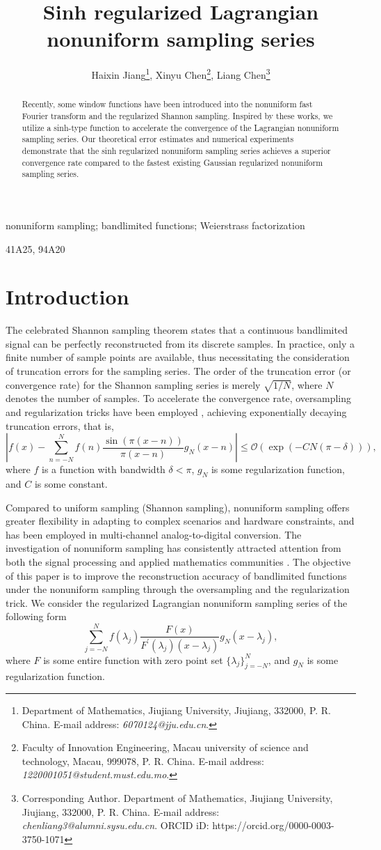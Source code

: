 \documentclass[a4paper]{article}
\title{Sinh regularized Lagrangian nonuniform sampling series}
\author{Haixin Jiang\thanks{Department of Mathematics, Jiujiang University, Jiujiang, 332000, P. R. China. E-mail address: {\it 6070124@jju.edu.cn}.}, \quad Xinyu Chen\thanks{Faculty of Innovation Engineering, Macau university of science and technology, Macau, 999078, P. R. China. E-mail address: {\it 1220001051@student.must.edu.mo}.}, \quad Liang Chen\thanks{ Corresponding Author.   Department of Mathematics, Jiujiang University, Jiujiang, 332000, P. R. China. E-mail address: {\it chenliang3@alumni.sysu.edu.cn}.   ORCID iD: https://orcid.org/0000-0003-3750-1071}}
\date{}
\numberwithin{equation}{section}
\begin{document}
\maketitle

\begin{abstract}
Recently, some window functions have been introduced into the nonuniform fast Fourier transform and the regularized Shannon sampling. Inspired by these works, we utilize a sinh-type function to accelerate the convergence of the Lagrangian nonuniform sampling series. Our theoretical error estimates and numerical experiments demonstrate that the sinh regularized nonuniform sampling series achieves a superior convergence rate compared to the fastest existing Gaussian regularized nonuniform sampling series.
\end{abstract}

 nonuniform sampling; bandlimited functions; Weierstrass factorization

 41A25, 94A20
\section{Introduction}


The celebrated Shannon sampling theorem states that a continuous bandlimited signal can be perfectly reconstructed from its discrete samples. In practice, only a finite number of sample points are available, thus necessitating the consideration of truncation errors for the sampling series. The order of the truncation error (or convergence rate) for the Shannon sampling series is merely $\sqrt{1/N}$, where $N$ denotes the number of samples. To accelerate the convergence rate, oversampling and regularization tricks have been employed \cite{jagerman1966bounds,Wei1997}, achieving exponentially decaying truncation errors, that is,
$$\left|f(x)-\sum_{n=-N}^{N}f(n)\frac{\sin(\pi(x-n))}{\pi(x-n)}g_{N}(x-n)\right|\le \mathcal{O}(\exp(-CN(\pi-\delta))), $$
where $f$ is a function with bandwidth $\delta<\pi$, $g_{N}$ is some regularization function, and  $C$ is some constant.

Compared to uniform sampling (Shannon sampling), nonuniform sampling offers greater flexibility in adapting to complex scenarios and hardware constraints, and has been employed in multi-channel analog-to-digital conversion. The investigation of nonuniform sampling has consistently attracted attention from both the signal processing \cite{selva2008functionally,margolis2008nonuniform,maymon2011sinc,JOHANSSON20152415} and applied mathematics communities \cite{Flornes1999,zayed2001lagrange,strohmer2006fast,annaby2016bounds,adcock2017density,wang2019gaussian,ghosh2023sampling}. The objective of this paper is to improve the reconstruction accuracy of bandlimited functions under the nonuniform sampling through the oversampling and the regularization trick. We consider the regularized Lagrangian nonuniform  sampling series of the following form
$$\sum_{j=-N}^{N} f(\lambda_{j})\frac{F(x)}{F^{'}(\lambda_{j})(x-\lambda_{j})}g_{N}(x-\lambda_{j}),$$
where $F$ is some entire function with zero point set $\{\lambda_{j}\}_{j=-N}^{N}$, and $g_{N}$ is some regularization function.
\end{document}
